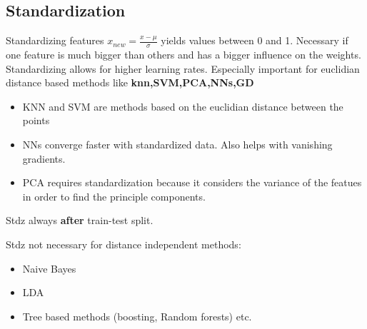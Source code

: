 \subsection{Standardization}

Standardizing features $x_{new} = \frac{x-\mu}{\sigma}$ yields values between 0 and 1. Necessary if one feature is much bigger than others and has a bigger influence on the weights. Standardizing allows for higher learning rates. Especially important for euclidian distance based methods like \textbf{knn,SVM,PCA,NNs,GD}
\begin{itemize}
    \item KNN and SVM are methods based on the euclidian distance between the points 
    \item NNs converge faster with standardized data. Also helps with vanishing gradients.
    \item PCA requires standardization because it considers the variance of the featues in order to find the principle components. 
\end{itemize}
Stdz always \textbf{after} train-test split.

Stdz not necessary for distance independent methods:
\begin{itemize}
    \item Naive Bayes
    \item LDA
    \item Tree based methods (boosting, Random forests) etc.
\end{itemize}